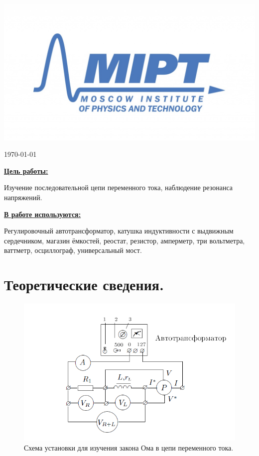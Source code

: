 \documentclass[a4paper, 12pt, twoside]{article}
\newenvironment{bottompar}{\par\vspace*{\fill}}{\clearpage}
\begin{document}
\begin{titlepage}
\begin{bottompar}
	\begin{center}
		\includegraphics[width = 80 mm]{logo.jpg}
	\end{center}
	{\large \today}

\end{bottompar}
\vfill %

\end{titlepage}

{\Large \uline { \textbf  {Цель работы:}}}

\vspace{2mm}
Изучение последовательной цепи переменного тока, наблюдение резонанса напряжений.
\vspace{\baselineskip}

{\Large \uline { \textbf  {В работе используются:}}}

\vspace{2mm}

Регулировочный автотрансформатор, катушка индуктивности с выдвижным сердечником, магазин ёмкостей, реостат, резистор, амперметр, три вольтметра, ваттметр, осциллограф, универсальный мост.

\section{Теоретические сведения.}
\begin{figure}[H]
		\centering
		\includegraphics[width = 0.7\linewidth]{sch1}
		\caption{Схема установки для изучения закона Ома в цепи переменного тока.}
		\label{sch:1}
\end{figure}
\end{document}

